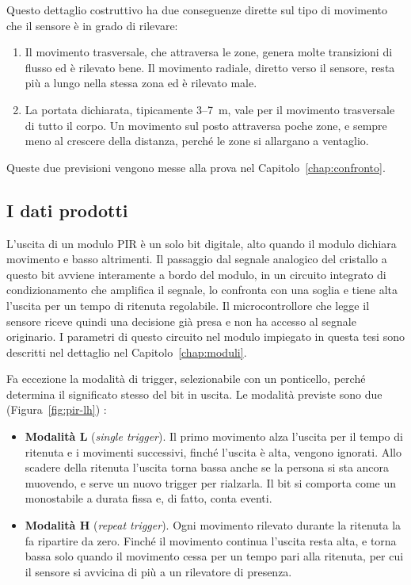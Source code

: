 Questo dettaglio costruttivo ha due conseguenze dirette sul tipo di movimento che il sensore è in grado di rilevare:

\begin{enumerate}
    \item Il movimento trasversale, che attraversa le zone, genera molte transizioni di flusso ed è rilevato bene. Il movimento radiale, diretto verso il sensore, resta più a lungo nella stessa zona ed è rilevato male.

    \item La portata dichiarata, tipicamente 3--7~m, vale per il movimento trasversale di tutto il corpo. Un movimento sul posto attraversa poche zone, e sempre meno al crescere della distanza, perché le zone si allargano a ventaglio.
\end{enumerate}

Queste due previsioni vengono messe alla prova nel Capitolo~\ref{chap:confronto}.

\subsection{I dati prodotti}
\label{subsec:pir-dati}

L'uscita di un modulo PIR è un solo bit digitale, alto quando il modulo dichiara movimento e basso altrimenti. Il passaggio dal segnale analogico del cristallo a questo bit avviene interamente a bordo del modulo, in un circuito integrato di condizionamento che amplifica il segnale, lo confronta con una soglia e tiene alta l'uscita per un tempo di ritenuta regolabile. Il microcontrollore che legge il sensore riceve quindi una decisione già presa e non ha accesso al segnale originario. I parametri di questo circuito nel modulo impiegato in questa tesi sono descritti nel dettaglio nel Capitolo~\ref{chap:moduli}.

Fa eccezione la modalità di trigger, selezionabile con un ponticello, perché determina il significato stesso del bit in uscita. Le modalità previste sono due (Figura~\ref{fig:pir-lh}) \cite{hcsr501}:

\begin{itemize}
    \item \textbf{Modalità L} (\textit{single trigger}). Il primo movimento alza l'uscita per il tempo di ritenuta e i movimenti successivi, finché l'uscita è alta, vengono ignorati. Allo scadere della ritenuta l'uscita torna bassa anche se la persona si sta ancora muovendo, e serve un nuovo trigger per rialzarla. Il bit si comporta come un monostabile a durata fissa e, di fatto, conta eventi.

    \item \textbf{Modalità H} (\textit{repeat trigger}). Ogni movimento rilevato durante la ritenuta la fa ripartire da zero. Finché il movimento continua l'uscita resta alta, e torna bassa solo quando il movimento cessa per un tempo pari alla ritenuta, per cui il sensore si avvicina di più a un rilevatore di presenza.
\end{itemize}

